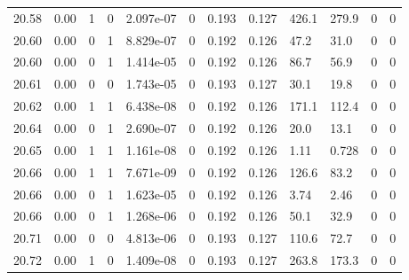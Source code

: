 \documentclass[preview]{standalone}
\begin{document}
{{{{{{{{{{{{{{{{\begin{tabular}{L{1.2cm}C{1.2cm} C{0.3cm}C{0.5cm} C{1.4cm}C{1.4cm} C{1.4cm}C{1.4cm} C{1.6cm}C{1.6cm} C{1.6cm}C{1.6cm}}
  20.58  &  0.00  & 1     &  0 &  2.097e-07  & 0  &  0.193&   0.127& 426.1 & 279.9   &  0 & 0  \\ 
  20.60  &  0.00  & 0     &  1 &  8.829e-07  & 0  &  0.192&   0.126& 47.2 & 31.0   &  0 & 0  \\ 
  20.60  &  0.00  & 0     &  1 &  1.414e-05  & 0  &  0.192&   0.126& 86.7 & 56.9   &  0 & 0  \\ 
  20.61  &  0.00  & 0     &  0 &  1.743e-05  & 0  &  0.193&   0.127& 30.1 & 19.8   &  0 & 0  \\ 
  20.62  &  0.00  & 1     &  1 &  6.438e-08  & 0  &  0.192&   0.126& 171.1 & 112.4   &  0 & 0  \\ 
  20.64  &  0.00  & 0     &  1 &  2.690e-07  & 0  &  0.192&   0.126& 20.0 & 13.1   &  0 & 0  \\ 
  20.65  &  0.00  & 1     &  1 &  1.161e-08  & 0  &  0.192&   0.126& 1.11 & 0.728   &  0 & 0  \\ 
  20.66  &  0.00  & 1     &  1 &  7.671e-09  & 0  &  0.192&   0.126& 126.6 & 83.2   &  0 & 0  \\ 
  20.66  &  0.00  & 0     &  1 &  1.623e-05  & 0  &  0.192&   0.126& 3.74 & 2.46   &  0 & 0  \\ 
  20.66  &  0.00  & 0     &  1 &  1.268e-06  & 0  &  0.192&   0.126& 50.1 & 32.9   &  0 & 0  \\ 
  20.71  &  0.00  & 0     &  0 &  4.813e-06  & 0  &  0.193&   0.127& 110.6 & 72.7   &  0 & 0  \\ 
  20.72  &  0.00  & 1     &  0 &  1.409e-08  & 0  &  0.193&   0.127& 263.8 & 173.3   &  0 & 0  \\ 
\hline 
\end{tabular} 

}}}}}}}}}}}}}}}}
\end{document}
